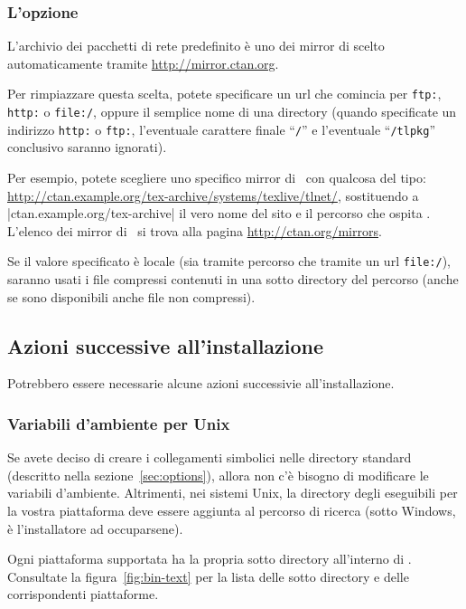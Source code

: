 \documentclass{article}
\begin{document}
\subsubsection{L'opzione }
\label{sec:location}

L'archivio dei pacchetti di rete predefinito è uno dei mirror di \CTAN{}
scelto automaticamente tramite \url{http://mirror.ctan.org}.

Per rimpiazzare questa scelta, potete specificare un url che comincia per
\texttt{ftp:}, \texttt{http:} o \texttt{file:/}, oppure il semplice nome
di una directory (quando specificate un indirizzo \texttt{http:} o
\texttt{ftp:}, l'eventuale carattere finale ``\texttt{/}'' e l'eventuale
``\texttt{/tlpkg}'' conclusivo saranno ignorati).

Per esempio, potete scegliere uno specifico mirror di \CTAN\ con qualcosa
del tipo:
\url{http://ctan.example.org/tex-archive/systems/texlive/tlnet/},
sostituendo a |ctan.example.org/tex-archive| il vero nome del sito e il
percorso che ospita \CTAN. L'elenco dei mirror di \CTAN\ si trova alla
pagina \url{http://ctan.org/mirrors}.

Se il valore specificato è locale (sia tramite percorso che tramite un url
\texttt{file:/}), saranno usati i file compressi contenuti in una sotto
directory  del percorso (anche se sono disponibili anche
file non compressi).


\subsection{Azioni successive all'installazione}
\label{sec:postinstall}

Potrebbero essere necessarie alcune azioni successivie all'installazione.


\subsubsection{Variabili d'ambiente per Unix}
\label{sec:env}

Se avete deciso di creare i collegamenti simbolici nelle directory standard
(descritto nella sezione~\ref{sec:options}), allora non c'è bisogno di
modificare le variabili d'ambiente. Altrimenti, nei sistemi Unix, la
directory degli eseguibili per la vostra piattaforma deve essere aggiunta al
percorso di ricerca (sotto Windows, è l'installatore ad occuparsene).

Ogni piattaforma supportata ha la propria sotto directory all'interno di
. Consultate la figura~\ref{fig:bin-text} per la lista
delle sotto directory e delle corrispondenti piattaforme.
\end{document}
